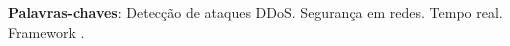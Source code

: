 \setlength{\absparsep}{18pt} %
\begin{resumo}
      
\textbf{Palavras-chaves}: Detecção de ataques DDoS. Segurança em redes. Tempo real. Framework .
\end{resumo}